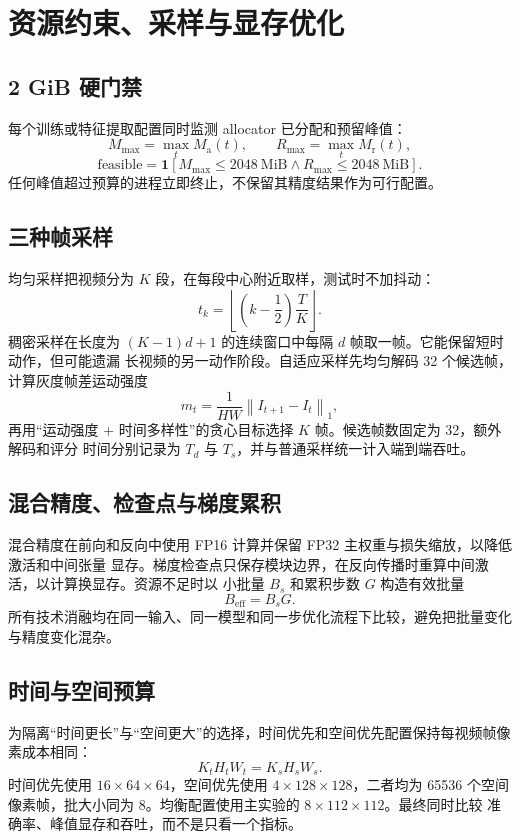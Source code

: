 \section{资源约束、采样与显存优化}

\subsection{2 GiB 硬门禁}

每个训练或特征提取配置同时监测 allocator 已分配和预留峰值：
\begin{equation}
  M_{\max}=\max_t M_{\mathrm{a}}(t),\qquad
  R_{\max}=\max_t M_{\mathrm{r}}(t),
  \label{eq:memory}
\end{equation}
\begin{equation}
  \mathrm{feasible}
  =\mathbf{1}\left[
  M_{\max}\leq2048\ \mathrm{MiB}
  \land
  R_{\max}\leq2048\ \mathrm{MiB}
  \right].
  \label{eq:feasible}
\end{equation}
任何峰值超过预算的进程立即终止，不保留其精度结果作为可行配置。

\subsection{三种帧采样}

均匀采样把视频分为 $K$ 段，在每段中心附近取样，测试时不加抖动：
\begin{equation}
  t_k=\left\lfloor
  \left(k-\frac{1}{2}\right)\frac{T}{K}
  \right\rfloor.
  \label{eq:uniform}
\end{equation}
稠密采样在长度为 $(K-1)d+1$ 的连续窗口中每隔 $d$ 帧取一帧。它能保留短时动作，但可能遗漏
长视频的另一动作阶段。自适应采样先均匀解码 32 个候选帧，计算灰度帧差运动强度
\begin{equation}
  m_t=\frac{1}{HW}
  \left\lVert I_{t+1}-I_t\right\rVert_1,
  \label{eq:motion}
\end{equation}
再用“运动强度 + 时间多样性”的贪心目标选择 $K$ 帧。候选帧数固定为 32，额外解码和评分
时间分别记录为 $T_d$ 与 $T_s$，并与普通采样统一计入端到端吞吐。

\subsection{混合精度、检查点与梯度累积}

混合精度在前向和反向中使用 FP16 计算并保留 FP32 主权重与损失缩放\cite{amp}，以降低激活和中间张量
显存。梯度检查点只保存模块边界，在反向传播时重算中间激活\cite{checkpoint}，以计算换显存。资源不足时以
小批量 $B_s$ 和累积步数 $G$ 构造有效批量
\begin{equation}
  B_{\mathrm{eff}}=B_sG.
  \label{eq:accumulation}
\end{equation}
所有技术消融均在同一输入、同一模型和同一步优化流程下比较，避免把批量变化与精度变化混杂。

\subsection{时间与空间预算}

为隔离“时间更长”与“空间更大”的选择，时间优先和空间优先配置保持每视频帧像素成本相同：
\begin{equation}
  K_tH_tW_t=K_sH_sW_s.
  \label{eq:equal_cost}
\end{equation}
时间优先使用 $16\times64\times64$，空间优先使用 $4\times128\times128$，二者均为 65536
个空间像素帧，批大小同为 8。均衡配置使用主实验的 $8\times112\times112$。最终同时比较
准确率、峰值显存和吞吐，而不是只看一个指标。
